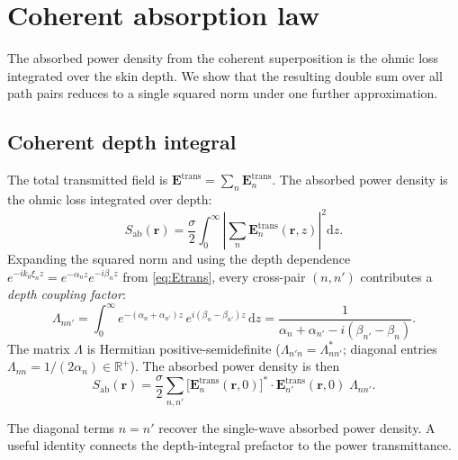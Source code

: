 \documentclass[11pt,a4paper]{article}
\theoremstyle{definition}      %
\newcommand{\rr}{\mathbf{r}}
\newcommand{\Sab}{S_{\mathrm{ab}}}
\newcommand{\diff}{\mathrm{d}}        %
\begin{document}
\section{Coherent absorption law}\label{sec:coherent-absorption-law}

The absorbed power density from the coherent superposition is the
ohmic loss integrated over the skin depth.  We show that the
resulting double sum over all path pairs reduces to a single squared
norm under one further approximation.

\subsection{Coherent depth integral}\label{sec:depth-integral}

The total transmitted field is
$\mathbf{E}^\mathrm{trans} = \sum_n \mathbf{E}_n^\mathrm{trans}$.
The absorbed power density is the ohmic loss integrated over depth:
\begin{equation}\label{eq:Sab-double-sum}
  \Sab(\rr) = \frac{\sigma}{2}\int_0^\infty
  \left|\sum_n \mathbf{E}_n^\mathrm{trans}(\rr,z)\right|^2 \diff z.
\end{equation}
Expanding the squared norm and using the depth dependence
$e^{-ik_0\xi_n z} = e^{-\alpha_n z}e^{-i\beta_n z}$ from
\cref{eq:Etrans}, every cross-pair $(n,n')$ contributes a
\emph{depth coupling factor}:
\begin{equation}\label{eq:Lambda}
  \Lambda_{nn'} = \int_0^\infty
  e^{-(\alpha_n+\alpha_{n'})z}\,e^{i(\beta_n-\beta_{n'})z}\,\diff z
  = \frac{1}{\alpha_n + \alpha_{n'} - i(\beta_{n'}-\beta_n)}.
\end{equation}
The matrix $\Lambda$ is Hermitian positive-semidefinite
($\Lambda_{n'n} = \Lambda_{nn'}^*$; diagonal entries
$\Lambda_{nn} = 1/(2\alpha_n) \in \mathbb{R}^+$).  The absorbed
power density is then
\begin{equation}\label{eq:Sab-Lambda}
  \Sab(\rr) = \frac{\sigma}{2}\sum_{n,n'}
  \bigl[\mathbf{E}_n^\mathrm{trans}(\rr,0)\bigr]^* \cdot
  \mathbf{E}_{n'}^\mathrm{trans}(\rr,0)\;\Lambda_{nn'}.
\end{equation}

The diagonal terms $n = n'$ recover the single-wave absorbed power
density.  A useful identity connects the depth-integral prefactor to
the power transmittance.
\end{document}
